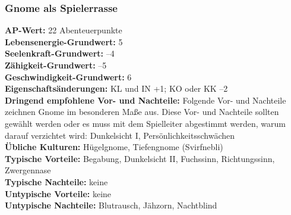 \documentclass[9pt]{article}
\begin{document}
\begin{multicols}{2}
\begin{shaded*}
	
\end{shaded*}
\begin{shaded*}
	\subsubsection{Gnome als Spielerrasse}
	\textbf{AP-Wert:} 22 Abenteuerpunkte
	\\
	\textbf{Lebensenergie-Grundwert:} 5
	\\
	\textbf{Seelenkraft-Grundwert:} –4
	\\
	\textbf{Zähigkeit-Grundwert:} –5
	\\
	\textbf{Geschwindigkeit-Grundwert:} 6
	\\
	\textbf{Eigenschaftsänderungen:} KL und IN +1; KO oder KK –2\\
	\textbf{Dringend empfohlene Vor- und Nachteile:} Folgende Vor- und Nachteile zeichnen Gnome im besonderen Maße aus. Diese Vor- und Nachteile sollten gewählt werden	oder es muss mit dem Spielleiter abgestimmt werden, warum darauf verzichtet wird: Dunkelsicht I, Persönlichkeitsschwächen
	\\
	\textbf{Übliche Kulturen:} Hügelgnome, Tiefengnome (Svirfnebli)
	\\
	\textbf{Typische Vorteile:} Begabung, Dunkelsicht II, Fuchssinn, Richtungssinn, Zwergennase
	\\
	\textbf{Typische Nachteile:} keine 
	\\
	\textbf{Untypische Vorteile:} keine
	\\
	\textbf{Untypische Nachteile:} Blutrausch, Jähzorn, Nachtblind
\end{shaded*}
\begin{shaded*}

\end{shaded*}
\end{multicols}
\end{document}
